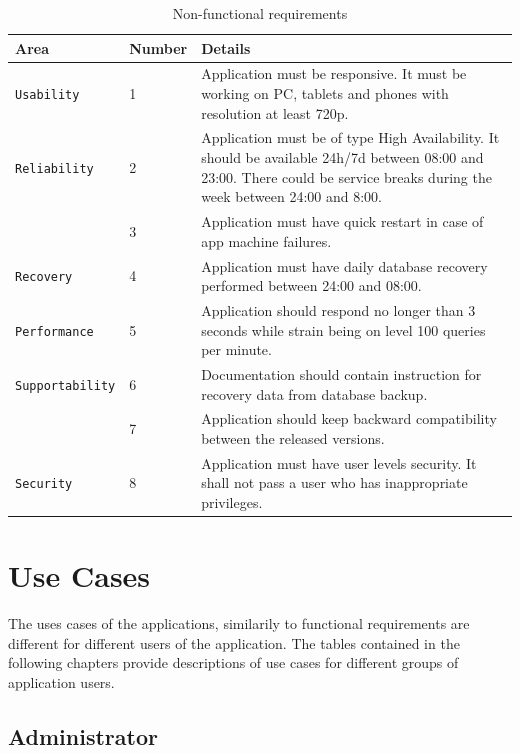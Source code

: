\documentclass[a4paper,11pt,twoside]{report}
\theoremstyle{definition}
\begin{document}
\begin{table}[!h]%
\caption[Non-functional Requirements]{Non-functional requirements}
\label{requirements}
\centering
\begin{tabular}{|p{3cm}|p{2cm}|p{11cm}|}
\hline
Area & Number & Details \\ \hline
\texttt{Usability} & 1 & Application must be responsive. It must be working on PC, tablets and phones with resolution at least 720p.\\  \hline
\texttt{Reliability} & 2 & Application must be of type High Availability. It should be available 24h/7d between 08:00 and 23:00. There could be service breaks during the week between 24:00 and 8:00. \\  \cline{2-3}
\texttt{} & 3 & Application must have quick restart in case of app machine failures. \\ \hline
\texttt{Recovery} & 4 & Application must have daily database recovery performed between 24:00 and 08:00. \\ \hline
\texttt{Performance} & 5 & Application should respond no longer than 3 seconds while strain being on level 100 queries per minute. \\ \hline
\texttt{Supportability} & 6 & Documentation should contain instruction for recovery data from database backup.  \\ \cline{2-3}
\texttt{} & 7 & Application should keep backward compatibility between the released versions. \\ \hline
\texttt{Security} & 8 & Application must have user levels security. It shall not pass a user who has inappropriate privileges. \\ \hline


\end{tabular}
\end{table}



\section{Use Cases}

The uses cases of the applications, similarily to functional requirements are different for different users of the application. The tables contained in the following chapters provide descriptions of use cases for different groups of application users.

\subsection{Administrator}
\end{document}
